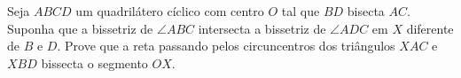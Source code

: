 Seja $ABCD$ um quadrilátero cíclico com centro $O$ tal que $BD$ bisecta $AC$.
Suponha que a bissetriz de $\angle ABC$ intersecta a bissetriz de $\angle ADC$ em $X$ diferente de $B$ e $D$.
Prove que a reta passando pelos circuncentros dos triângulos $XAC$ e $XBD$ bissecta o segmento $OX$.

